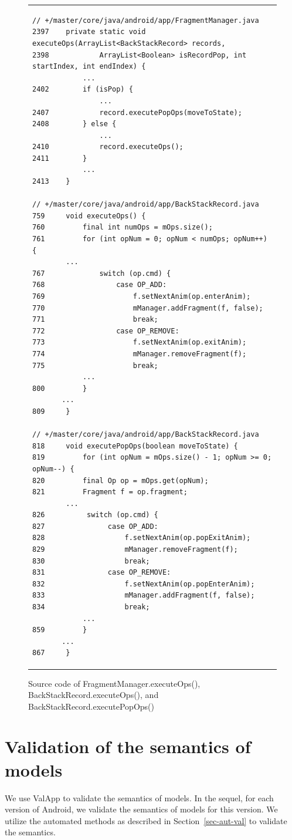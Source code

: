 \begin{figure}[htbp]
\centering
\begin{tabular*}{\linewidth}{l}
\begin{lstlisting}
// +/master/core/java/android/app/FragmentManager.java
2397    private static void executeOps(ArrayList<BackStackRecord> records,
2398            ArrayList<Boolean> isRecordPop, int startIndex, int endIndex) {
            ...
2402        if (isPop) {
                ...
2407            record.executePopOps(moveToState);
2408        } else {
                ...
2410            record.executeOps();
2411        }
            ...
2413    }

// +/master/core/java/android/app/BackStackRecord.java
759     void executeOps() {
760         final int numOps = mOps.size();
761         for (int opNum = 0; opNum < numOps; opNum++) {
		...
767             switch (op.cmd) {
768                 case OP_ADD:
769                     f.setNextAnim(op.enterAnim);
770                     mManager.addFragment(f, false);
771                     break;
772                 case OP_REMOVE:
773                     f.setNextAnim(op.exitAnim);
774                     mManager.removeFragment(f);
775                     break;
	    	...
800	    	}
	   ...
809     }

// +/master/core/java/android/app/BackStackRecord.java
818     void executePopOps(boolean moveToState) {
819         for (int opNum = mOps.size() - 1; opNum >= 0; opNum--) {
820         final Op op = mOps.get(opNum);
821         Fragment f = op.fragment;
		...
826          switch (op.cmd) {
827               case OP_ADD:
828                   f.setNextAnim(op.popExitAnim);
829                   mManager.removeFragment(f);
830                   break;
831               case OP_REMOVE:
832                   f.setNextAnim(op.popEnterAnim);
833                   mManager.addFragment(f, false);
834                   break;
	    	...
859	        }
	   ...
867     }
\end{lstlisting}
\end{tabular*}
\caption{Source code of FragmentManager.executeOps(), BackStackRecord.executeOps(), and BackStackRecord.executePopOps()}\label{code-executeOps}
\end{figure}

\section{Validation of the semantics of {\AMASS} models}\label{app-sem-val-amass}
%
We use ValApp to validate the semantics of {\AMASS} models. In the sequel, for each version of Android, we validate the semantics of {\AMASS} models for this version. 
We utilize the automated methods as described in Section~\ref{sec-aut-val} to validate the semantics. 

